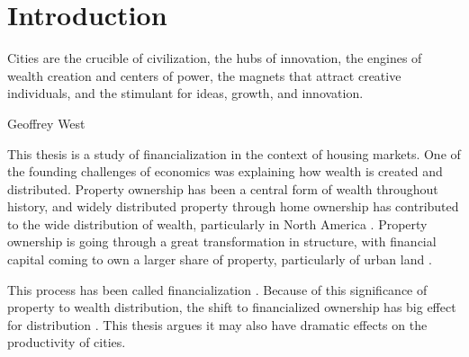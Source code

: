 \chapter{Introduction} \label{chapter-introduction}

\epigraph{Cities are the crucible of civilization, the hubs of innovation, the engines of wealth creation and centers of power, the magnets that attract creative individuals, and the stimulant for ideas, growth, and innovation.}{Geoffrey West}

This thesis is a study of financialization in the context of housing markets.
One of the founding challenges of economics was explaining how wealth is created and distributed. Property ownership has  been a central form of wealth %
throughout history,  
and widely distributed property through home ownership has contributed to the wide distribution of wealth, particularly in North America \cite{pikettyCapitalTwentyfirstCentury2014}. %
Property ownership is going through a great transformation in structure, with financial capital coming to own a larger share of property,  particularly of urban land \cite{farhaReportFinancializationHousing2017, palleyFinancializationWhatIt2007}. %

This process has been called financialization \cite{farhaReportFinancializationHousing2017, hansenFinanceCapitalismFinancialization2014}. 
Because of this significance of property to wealth distribution, the shift to financialized ownership %
has big effect for distribution \cite{tomaskovic-deveyFinancializationCausesInequality2013, palleyFinancializationWhatIt2007, seccarecciaUnderstandingFinancializationHistory2013, nemtinFinancializationHousingSocial2021}. %
This thesis argues it may also have dramatic effects on the productivity of cities.

